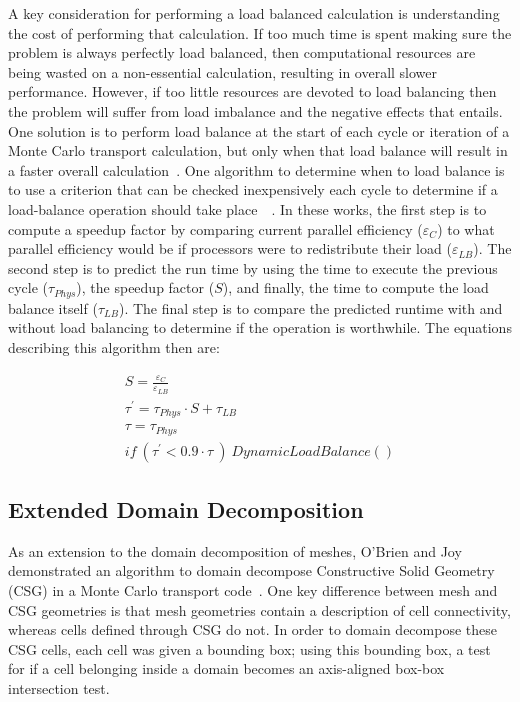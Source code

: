 %
A key consideration for performing a load balanced calculation is understanding the cost of performing that calculation.
%
If too much time is spent making sure the problem is always perfectly load balanced, then computational resources are being wasted on a non-essential calculation, resulting in overall slower performance.
%
However, if too little resources are devoted to load balancing then the problem will suffer from load imbalance and the negative effects that entails.
%
One solution is to perform load balance at the start of each cycle or iteration of a Monte Carlo transport calculation, but only when that load balance will result in a faster overall calculation~\cite{o2005dynamic}.
%
One algorithm to determine when to load balance is to use a
criterion that can be checked inexpensively each cycle to determine if a load-balance operation should take place~\cite{procassini2005load}~\cite{o2005dynamic}.
%
In these works, the first step is to compute a speedup factor by comparing current parallel efficiency ($ \varepsilon_C $) to what parallel efficiency would be if processors were to redistribute their load ($ \varepsilon_{LB} $).
%
The second step is to predict the run time by using the time to execute the previous cycle ($ \tau_{Phys} $), the speedup factor ($S$), and finally, the time to compute the load balance itself ($ \tau_{LB} $).
%
The final step is to compare the predicted runtime with and without load balancing to determine if the operation is worthwhile.
%
The equations describing this algorithm then are:

\begin{eqnarray}
S = \frac{\varepsilon_C}{\varepsilon_{LB}} \\
\tau^{'} = \tau_{Phys} \cdot S + \tau_{LB} \\
\tau = \tau_{Phys} \\
if\ (\tau^{'} < 0.9 \cdot \tau \ )\ DynamicLoadBalance()
\end{eqnarray}

\subsection*{Extended Domain Decomposition}

As an extension to the domain decomposition of meshes, O'Brien and Joy demonstrated an algorithm to domain decompose Constructive Solid Geometry (CSG) in a Monte Carlo transport code~\cite{o2009domain}.
%
One key difference between mesh and CSG geometries is that mesh geometries contain a description of cell connectivity, whereas cells defined through CSG do not.
%
In order to domain decompose these CSG cells, each cell was given a bounding box; using this bounding box, a test for if a cell belonging inside a domain becomes an axis-aligned box-box intersection test.
%

